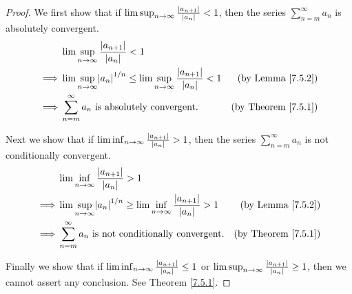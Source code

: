 \begin{proof}
We first show that if \(\lim\sup_{n \to \infty} \frac{\abs*{a_{n + 1}}}{\abs*{a_n}} < 1\), then the series \(\sum_{n = m}^\infty a_n\) is absolutely convergent.
\begin{align*}
& \lim\sup_{n \to \infty} \frac{\abs*{a_{n + 1}}}{\abs*{a_n}} < 1 \\
\implies & \lim\sup_{n \to \infty} \abs*{a_n}^{1 / n} \leq \lim\sup_{n \to \infty} \frac{\abs*{a_{n + 1}}}{\abs*{a_n}} < 1 & \text{(by Lemma \ref{7.5.2})} \\
\implies & \sum_{n = m}^\infty a_n \text{ is absolutely convergent}. & \text{(by Theorem \ref{7.5.1})}
\end{align*}

Next we show that if \(\lim\inf_{n \to \infty} \frac{\abs*{a_{n + 1}}}{\abs*{a_n}} > 1\), then the series \(\sum_{n = m}^\infty a_n\) is not conditionally convergent.
\begin{align*}
& \lim\inf_{n \to \infty} \frac{\abs*{a_{n + 1}}}{\abs*{a_n}} > 1 \\
\implies & \lim\sup_{n \to \infty} \abs*{a_n}^{1 / n} \geq \lim\inf_{n \to \infty} \frac{\abs*{a_{n + 1}}}{\abs*{a_n}} > 1 & \text{(by Lemma \ref{7.5.2})} \\
\implies & \sum_{n = m}^\infty a_n \text{ is not conditionally convergent}. & \text{(by Theorem \ref{7.5.1})}
\end{align*}

Finally we show that if \(\lim\inf_{n \to \infty} \frac{\abs*{a_{n + 1}}}{\abs*{a_n}} \leq 1\) or \(\lim\sup_{n \to \infty} \frac{\abs*{a_{n + 1}}}{\abs*{a_n}} \geq 1\), then we cannot assert any conclusion.
See Theorem \ref{7.5.1}.
\end{proof}